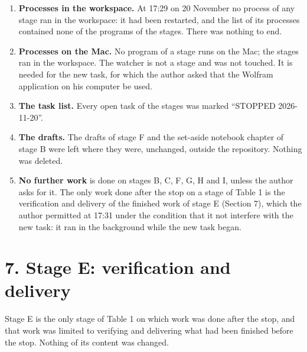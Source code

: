 \documentclass[
  10pt,
]{article}
\providecommand{\tightlist}{%
  \setlength{\itemsep}{0pt}\setlength{\parskip}{0pt}}
\begin{document}
\begin{enumerate}
\def\labelenumi{\arabic{enumi}.}
\tightlist
\item
  \textbf{Processes in the workspace.} At 17:29 on 20 November no
  process of any stage ran in the workspace: it had been restarted, and
  the list of its processes contained none of the programs of the
  stages. There was nothing to end.
\item
  \textbf{Processes on the Mac.} No program of a stage runs on the Mac;
  the stages ran in the workspace. The watcher is not a stage and was
  not touched. It is needed for the new task, for which the author asked
  that the Wolfram application on his computer be used.
\item
  \textbf{The task list.} Every open task of the stages was marked
  ``STOPPED 2026-11-20''.
\item
  \textbf{The drafts.} The drafts of stage F and the set-aside notebook
  chapter of stage B were left where they were, unchanged, outside the
  repository. Nothing was deleted.
\item
  \textbf{No further work} is done on stages B, C, F, G, H and I, unless
  the author asks for it. The only work done after the stop on a stage
  of Table 1 is the verification and delivery of the finished work of
  stage E (Section 7), which the author permitted at 17:31 under the
  condition that it not interfere with the new task: it ran in the
  background while the new task began.
\end{enumerate}

\hypertarget{stage-e-verification-and-delivery}{%
\section{7. Stage E: verification and
delivery}\label{stage-e-verification-and-delivery}}

Stage E is the only stage of Table 1 on which work was done after the
stop, and that work was limited to verifying and delivering what had
been finished before the stop. Nothing of its content was changed.
\end{document}
